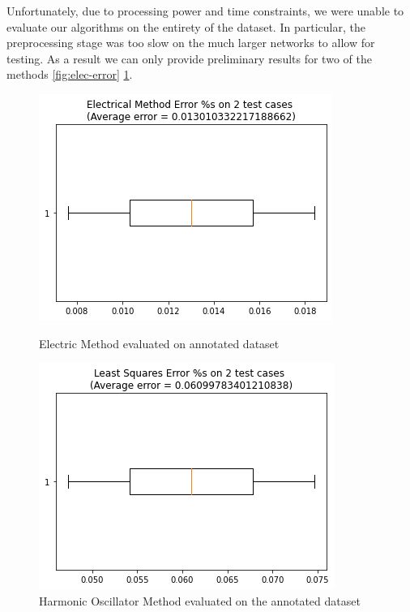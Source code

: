 \documentclass{article}
\numberwithin{equation}{section}
\theoremstyle{definition}
\begin{document}
Unfortunately, due to processing power and time constraints, we were unable to evaluate our algorithms on the entirety of the dataset. In particular, the preprocessing stage was too slow on the much larger networks to allow for testing. As a result we can only provide preliminary results for two of the methods \ref{fig:elec-error} \ref{fig:harm-osc-error}.


\begin{figure}[h!]
\begin{minipage}[c]{0.4\linewidth}
\includegraphics[scale=.55]{Jupyter Notebook LaTeX/electricerror.png}
\caption{Electric Method evaluated on annotated dataset}
\label{fig:elec-error}
\end{minipage}
\hfill
\begin{minipage}[c]{0.4\linewidth}
    \centering
    \includegraphics[scale=.55]{Jupyter Notebook LaTeX/leastsquareerror.png}
    \caption{Harmonic Oscillator Method evaluated on the annotated dataset}
    \label{fig:harm-osc-error}
\end{minipage}%
\end{figure}


\end{document}
